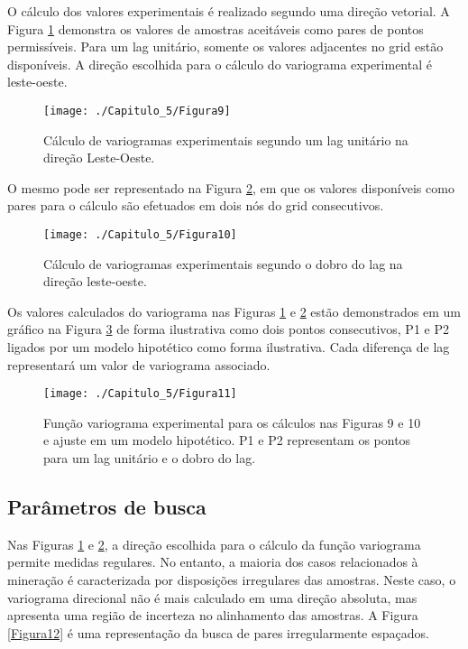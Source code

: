 O cálculo dos valores experimentais é realizado segundo uma direção vetorial. A Figura \ref{Figura9} demonstra os valores de amostras aceitáveis como pares de pontos permissíveis. Para um lag unitário, somente os valores adjacentes no grid estão disponíveis. A direção escolhida para o cálculo do variograma experimental é leste-oeste. 

\begin{figure}[H]
	\centering
	\texttt{[image: ./Capitulo\_5/Figura9]}
	\caption{Cálculo de variogramas experimentais segundo um lag unitário na direção Leste-Oeste.}
	\label{Figura9}
\end{figure}

O mesmo pode ser representado na Figura \ref{Figura10}, em que os valores disponíveis como pares para o cálculo são efetuados em dois nós do grid consecutivos. 

\begin{figure}[H]
	\centering
	\texttt{[image: ./Capitulo\_5/Figura10]}
	\caption{Cálculo de variogramas experimentais segundo o dobro do lag na direção leste-oeste.}
	\label{Figura10}
\end{figure}

Os valores calculados do variograma nas  Figuras \ref{Figura9} e \ref{Figura10} estão demonstrados em um gráfico na Figura \ref{Figura11} de forma ilustrativa como dois pontos consecutivos, P1 e P2 ligados por um modelo hipotético como forma ilustrativa. Cada diferença de lag representará um valor de variograma associado. 

\begin{figure}[H]
	\centering
	\texttt{[image: ./Capitulo\_5/Figura11]}
	\caption{Função variograma experimental para os cálculos nas Figuras 9 e 10 e ajuste em um modelo hipotético. P1 e P2 representam os pontos para um lag unitário e o dobro do lag.}
	\label{Figura11}
\end{figure}

\subsection{Parâmetros de busca}

Nas Figuras \ref{Figura9} e \ref{Figura10}, a direção escolhida para o cálculo da função variograma permite medidas regulares. No entanto, a maioria dos casos relacionados à mineração é caracterizada por disposições irregulares das amostras. Neste caso, o variograma direcional não é mais calculado em uma direção absoluta, mas apresenta uma região de incerteza no alinhamento das amostras. A Figura \ref{Figura12} é uma representação da busca de pares irregularmente espaçados.

